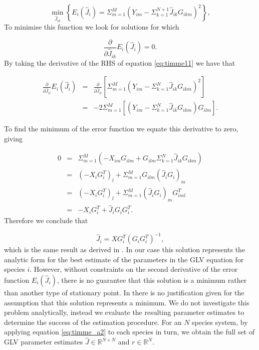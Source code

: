 \begin{equation}\label{eq:timme11}
\min_{\hat{J}_{ik}} \left\lbrace E_i(\hat{J}_i) = \Sigma_{m=1}^{M}\left(Y_{im} - \Sigma_{k=1}^{N+1}\hat{J}_{ik}G_{ikm}\right)^2 \right\rbrace,
\end{equation}
%
To minimise this function we look for solutions for which

\begin{equation}\label{eq:timme12}
\frac{\partial}{\partial \hat{J}_{ik}} E_i(\hat{J}_i) = 0.
\end{equation}
%
By taking the derivative of the RHS of equation \eqref{eq:timme11} we have that

\begin{eqnarray}
\frac{\partial}{\partial \hat{J}_{il}} E_i(\hat{J}_i) &=& \frac{\partial}{\partial \hat{J}_{il}} \left[\Sigma_{m=1}^{M}\left(Y_{im} - \Sigma_{k=1}^{N}\hat{J}_{ik}G_{ikm}\right)^2\right] \nonumber \\
    &=& -2\Sigma_{m=1}^{M}\left[\left(Y_{im} - \Sigma_{k=1}^{N}\hat{J}_{ik}G_{ikm}\right)G_{ilm}\right]. \nonumber
\end{eqnarray}

To find the minimum of the error function we equate this derivative to zero, giving

\begin{eqnarray}
0 &=& \Sigma_{m=1}^{M}\left(-X_{im}G_{ilm} + G_{ilm}\Sigma_{k=1}^{N}\hat{J}_{ik}G_{ikm}\right) \nonumber \\
  &=& \left(-X_iG_i^T\right)_{l} + \Sigma_{m=1}^{M}G_{ilm}\left(\hat{J}_iG_i\right)_m   \nonumber \\
  &=& \left(-X_iG_i^T\right)_{l} + \Sigma_{m=1}^{M}\left(\hat{J}_iG_i\right)_mG_{iml}^T  \nonumber \\
   &=& -X_iG_i^T + \hat{J}_iG_iG_i^T. 
\end{eqnarray}
%
Therefore we conclude that

\begin{equation}\label{eq:timme_a2}
\hat{J}_i = XG^T_i\left(G_iG^T_i\right)^{-1},
\end{equation}
%
which is the same result as derived in \cite{}. In our case this solution represents the analytic form for the best estimate of the parameters in the GLV equation for species $i$. However, without constraints on the second derivative of the error function $E_i(\hat{J}_i)$, there is no guarantee that this solution is a minimum rather than another type of stationary point. In \cite{} there is no justification given for the assumption that this solution represents a minimum. We do not investigate this problem analytically, instead we evaluate the resulting parameter estimates to determine the success of the estimation procedure. For an $N$ species system, by applying equation \eqref{eq:timme_a2} to each species in turn, we obtain the full set of GLV parameter estimates $\hat{J} \in \mathbb{R}^{N \times N}$ and $r \in \mathbb{R}^N$.


